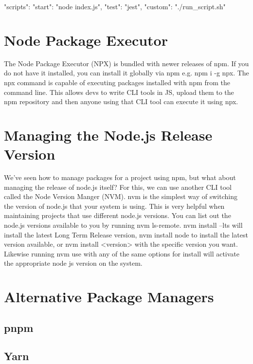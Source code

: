 \documentclass{article}
\begin{document}
\begin{tslst}

    "scripts": {
        "start": "node index.js",
        "test": "jest",
        "custom": "./run_script.sh"
    }

\end{tslst}

\section{Node Package Executor}

The Node Package Executor (NPX) is bundled with newer releases of npm. If you do not have it installed, you can
install it globally via npm e.g. npm i -g npx. The npx command is capable of executing packages installed with
npm from the command line. This allows devs to write CLI tools in JS, upload them to the npm repository and
then anyone using that CLI tool can execute it using npx.

\section{Managing the Node.js Release Version}

We've seen how to manage packages for a project using npm, but what about managing the release of node.js
itself? For this, we can use another CLI tool called the Node Version Manger (NVM). nvm is the simplest
way of switching the version of node.js that your system is using. This is very helpful when maintaining
projects that use different node.js versions. You can list out the node.js versions available to you by
running nvm ls-remote. nvm install --lts will install the latest Long Term Release version, nvm install node
to install the latest version available, or nvm install <version> with the specific version you want. Likewise
running nvm use with any of the same options for install will activate the appropriate node js version on the
system.

\section{Alternative Package Managers}

\subsection{pnpm}

\subsection{Yarn}
\end{document}
